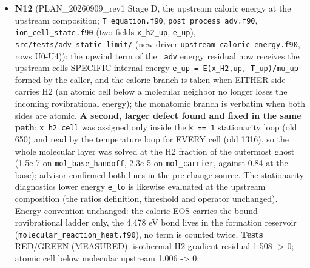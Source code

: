 \documentclass[english,a4paper]{my_memo}
\begin{document}
\begin{itemize}
  when the domain passes the stellar radius (\texttt{wasp\_full} read at
  \texttt{EXHALE\_TRANSIT\_RSTAR\_RSUN=0.30}: 419 -\textgreater{} 500 sampled rows, 81 above the
  cap); on \texttt{wasp\_full} the rays near \texttt{b\ =\ 1} take 99 percent of their
  Ly-alpha line-center depth from uncorrected rows. Suite RED on the
  pre-change copies (11 rows, the mask present and no shared selection),
  GREEN 11/0 on the tree; advisor rerun 11/0; +0.3 s on the whole script.
  Advisor: one \texttt{per-line} in the library header reworded. Reported, not
  fixed: the wavelength-resolved share and the file metadata wait for
  decision 17; \texttt{np.loadtxt(...,\ max\_rows=1)} at line 896 warns on every
  run and duplicates the column count of line 325.
\item
  \textbf{N12} (PLAN\_20260909\_rev1 Stage D, the upstream caloric energy at the
  upstream composition; \texttt{T\_equation.f90}, \texttt{post\_process\_adv.f90},
  \texttt{ion\_cell\_state.f90} (two fields \texttt{x\_h2\_up}, \texttt{e\_up}),
  \texttt{src/tests/adv\_static\_limit/} (new driver \texttt{upstream\_caloric\_energy.f90},
  rows U0-U4)): the upwind term of the \texttt{\_adv} energy residual now receives
  the upstream cell\textquotesingle s SPECIFIC internal energy \texttt{e\_up\ =\ E(x\_H2,up,\ T\_up)/mu\_up}
  formed by the caller, and the caloric branch is taken when EITHER side
  carries H2 (an atomic cell below a molecular neighbor no longer loses the
  incoming rovibrational energy); the monatomic branch is verbatim when both
  sides are atomic. \textbf{A second, larger defect found and fixed in the same
  path}: \texttt{x\_h2\_cell} was assigned only inside the \texttt{k\ ==\ 1} stationarity
  loop (old 650) and read by the temperature loop for EVERY cell (old
  1316), so the whole molecular layer was solved at the H2 fraction of the
  outermost ghost (1.5e-7 on \texttt{mol\_base\_handoff}, 2.3e-5 on \texttt{mol\_carrier},
  against 0.84 at the base); advisor confirmed both lines in the pre-change
  source. The stationarity diagnostic\textquotesingle s lower energy \texttt{e\_lo} is likewise
  evaluated at the upstream composition (the ratio\textquotesingle s definition, threshold
  and operator unchanged). Energy convention unchanged: the caloric EOS
  carries the bound rovibrational ladder only, the 4.478 eV bond lives in
  the formation reservoir (\texttt{molecular\_reaction\_heat.f90}), no term is
  counted twice. \textbf{Tests} RED/GREEN (MEASURED): isothermal H2 gradient
  residual 1.508 -\textgreater{} 0; atomic cell below molecular upstream 1.006 -\textgreater{} 0;

\end{itemize}
\end{document}
